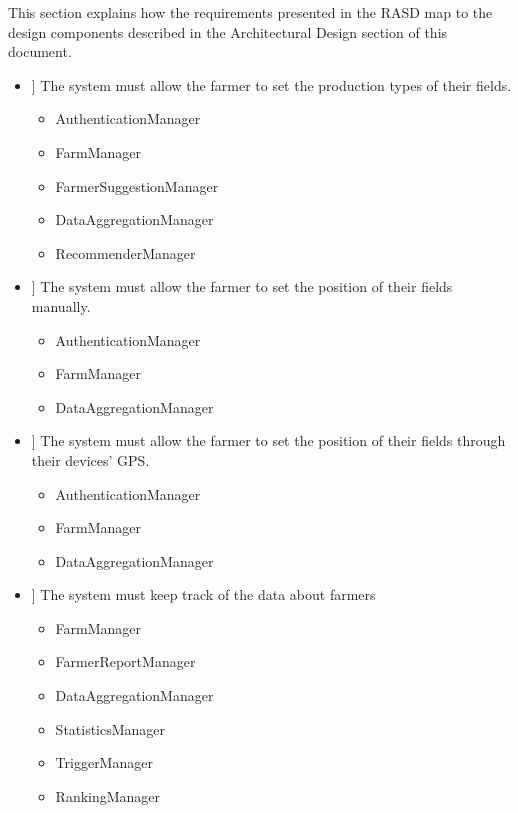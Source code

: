 \newcommand\req[1]{\item[[ R#1]]}

\noindent
This section explains how the requirements presented in the RASD map to the design components described in the Architectural Design section of this document.\\ \smallskip

\begin{itemize}
\req{1} The system must allow the farmer to set the production types of their fields.

\begin{itemize}

\item AuthenticationManager
\item FarmManager
\item FarmerSuggestionManager
\item DataAggregationManager
\item RecommenderManager
\end{itemize}

\req{2} The system must allow the farmer to set the position of their fields manually.
\begin{itemize}

\item AuthenticationManager
\item FarmManager
\item DataAggregationManager

\end{itemize}
\req{3} The system must allow the farmer to set the position of their fields through their devices' GPS.
\begin{itemize}

\item AuthenticationManager
\item FarmManager
\item DataAggregationManager
\end{itemize}

\req{4} The system must keep track of the data about farmers
\begin{itemize}


\item FarmManager
\item FarmerReportManager
\item DataAggregationManager
\item StatisticsManager
\item TriggerManager
\item RankingManager


\end{itemize}
\end{itemize}

